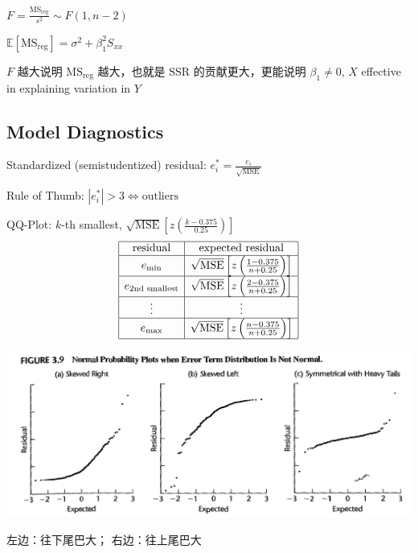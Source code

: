 \documentclass[9pt,landscape]{article}
\begin{document}
\begin{multicols}{3}
$F=\frac{\mathrm{MS}_{\mathrm{reg}}}{s^2}\sim F(1, n-2)$

$\mathbb{E}[\mathrm{MS}_{\mathrm{reg}}]=\sigma^2+\beta_1^2S_{xx}$

$F$ 越大说明 $\mathrm{MS}_{\mathrm{reg}}$ 越大，也就是 $\mathrm{SSR}$ 的贡献更大，更能说明 $\beta_1\neq 0$, $X$ effective in explaining variation in $Y$

\subsection{Model Diagnostics}

Standardized (semistudentized) residual: $e_i^*=\frac{e_i}{\sqrt{\mathrm{MSE}}}$

Rule of Thumb: $\left|e_i^*\right|>3\Leftrightarrow\text{outliers}$

QQ-Plot: $k$-th smallest, $\sqrt{\mathrm{MSE}}\left[z\left(\frac{k-0.375}{0.25}\right)\right]$
\[
\begin{array}{|c|c|}
\hline
\text{residual} & \text{expected residual} \\
\hline
e_{\min} & \sqrt{\text{MSE}} \left[ z \left( \frac{1 - 0.375}{n + 0.25} \right) \right] \\
\hline
e_{\text{2nd smallest}} & \sqrt{\text{MSE}} \left[ z \left( \frac{2 - 0.375}{n + 0.25} \right) \right] \\
\hline
\vdots & \vdots \\
\hline
e_{\max} & \sqrt{\text{MSE}} \left[ z \left( \frac{n - 0.375}{n + 0.25} \right) \right] \\
\hline
\end{array}
\]

\includegraphics[width=\columnwidth]{imgs/qq-plot}

左边：往下尾巴大；
右边：往上尾巴大


\end{multicols}
\end{document}
